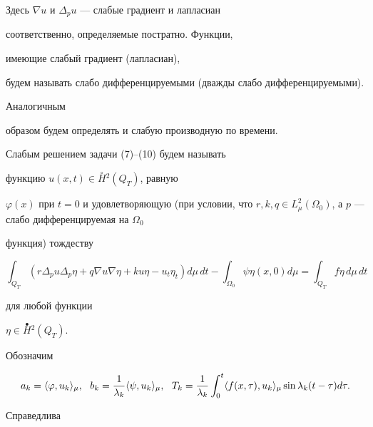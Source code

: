 Здесь $\nabla u$ и $\Delta_p u$ --- слабые градиент и лапласиан


соответственно, определяемые постратно. Функции, 


имеющие слабый градиент (лапласиан), 


будем называть слабо дифференцируемыми (дважды слабо дифференцируемыми). 


Аналогичным 


образом будем определять и слабую производную по времени. 





\noindent{}Слабым решением задачи (7)--(10) будем называть 


функцию $u(x,t) \in \overset{\circ}{H}{}^2(Q_T)$, равную 


$\varphi(x)$ при $t=0$ и удовлетворяющую (при условии, что $r,k,q\in 


L^2_\mu(\Omega_0)$, а $p$ --- слабо дифференцируемая на $\Omega_0$


функция) тождеству 


$$ 


\int_{Q_T}{(r\Delta_{p}u\Delta_{p}\eta+q\nabla 


u\nabla\eta+ku\eta-u_t \eta_t)}d\mu\,dt 


-\int_{\Omega_0}{\psi\eta(x,0)}d\mu=\int_{Q_T}{f\eta}\,d\mu\,dt 


$$ 


для любой функции 


$\eta \in \overset{\bullet}{H}{}^2(Q_T)$. 


 


Обозначим 


$$ 


a_k = \la \varphi,u_k\ra_\mu,\ \  


b_k = \frac{1}{\lambda_k}\la \psi,u_k\ra_\mu,\ \ 


T_k = \frac{1}{\lambda_k}\int_0^{t}\la f(x,\tau),u_k\ra_\mu 


\sin{\lambda_{k}(t-\tau)}d\tau. 


$$ 


Справедлива 


\vspace*{-1mm}


 



